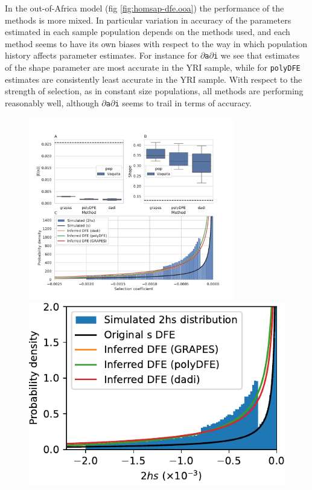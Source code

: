 \documentclass[hidelinks]{article}
\newcommand{\polydfe}{\texttt{polyDFE}\xspace}
\newcommand{\dadi}{$\partial$\texttt{a}$\partial$\texttt{i}\xspace}
\begin{document}
    In the out-of-Africa model (fig \ref{fig:homsap-dfe.ooa}) the performance of the methods is more mixed. 
    In particular variation in accuracy of the parameters estimated in each
    sample population depends on the methods used, and each method seems to 
    have its own biases with respect to the way in which population history 
    affects parameter estimates. For instance for \dadi we see that estimates of 
    the shape parameter are most accurate in the YRI sample, while for \polydfe
    estimates are consistently least accurate in the YRI sample. 
    With respect to the strength of selection, as in constant size populations,
    all methods are performing reasonably well, although \dadi seems to
    trail in terms of accuracy. 


    \begin{figure}
        \centering
        \includegraphics[width=0.8\textwidth]{figures/PhoSin/Vaquita2Epoch_1R22/PhoSin_Vaquita2Epoch_1R22_Gamma_R22_Phocoena_sinus.mPhoSin1.pri.110_exons_DFE_plot.pdf}
\includegraphics{figures/PhoSin/Vaquita2Epoch_1R22/hs_hist.pdf}

\end{figure}
\end{document}
